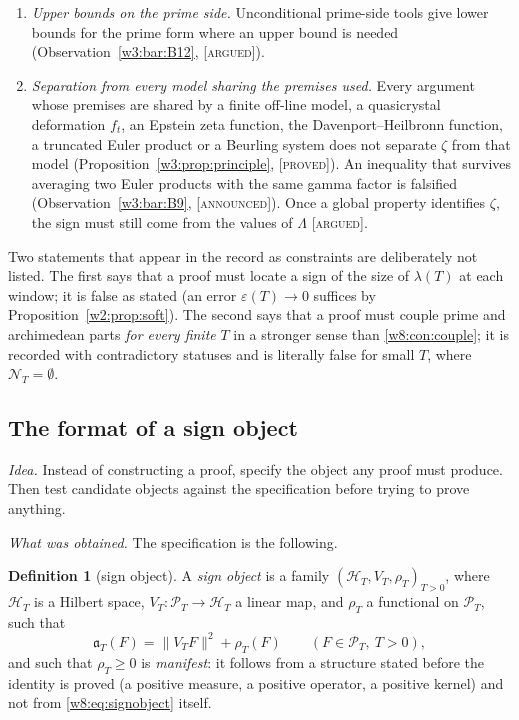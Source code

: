 \documentclass[11pt]{amsart}
\theoremstyle{definition}
\newtheorem{definition}[theorem]{Definition}
\theoremstyle{remark}
\numberwithin{equation}{section}
\newcommand{\PT}{\mathcal{P}_T}                        %
\newcommand{\NT}{\mathcal{N}_T}                        %
\newcommand{\aT}{\mathfrak{a}_T}                       %
\newcommand{\lam}{\lambda(T)}                          %
\newcommand{\stag}[1]{\textsc{[#1]}}
\newcommand{\PROVED}{\stag{proved}}
\newcommand{\ARGUED}{\stag{argued}}
\newcommand{\ANNOUNCED}{\stag{announced}}
\newcommand{\entry}[1]{\par\smallskip\noindent\textit{#1.}\enspace}
\begin{document}
\begin{enumerate}[label=\textbf{C\arabic*.},ref=C\arabic*,leftmargin=*]
envelope argument works (Observation~\ref{w3:bar:B4b}, \ANNOUNCED). The object must be defined for all windows at
once.
\item\label{w8:con:sign} \emph{Upper bounds on the prime side.} Unconditional prime-side tools give lower bounds for
the prime form where an upper bound is needed (Observation~\ref{w3:bar:B12}, \ARGUED).
\item\label{w8:con:separate} \emph{Separation from every model sharing the premises used.} Every argument whose premises
are shared by a finite off-line model, a quasicrystal deformation $f_t$, an Epstein zeta function, the
Davenport--Heilbronn function, a truncated Euler product or a Beurling system does not separate $\zeta$ from that model
(Proposition~\ref{w3:prop:principle}, \PROVED). An inequality that survives averaging two Euler products with the same
gamma factor is falsified (Observation~\ref{w3:bar:B9}, \ANNOUNCED). Once a global property identifies $\zeta$, the
sign must still come from the values of $\Lambda$ \ARGUED.
\end{enumerate}

Two statements that appear in the record as constraints are deliberately not listed. The first says
that a proof must locate a sign of the size of $\lam$ at each window; it is false as stated (an error
$\varepsilon(T)\to0$ suffices by Proposition~\ref{w2:prop:soft}). The second says that a proof must couple prime and
archimedean parts \emph{for every finite} $T$ in a stronger sense than \ref{w8:con:couple}; it is recorded with contradictory
statuses and is literally false for small $T$, where $\NT=\emptyset$.

\subsection{The format of a sign object}\label{w8:fam:R26}

\entry{Idea} Instead of constructing a proof, specify the object any proof must produce. Then test candidate objects
against the specification before trying to prove anything.

\entry{What was obtained} The specification is the following.

\begin{definition}[sign object]\label{w8:def:signobject}
A \emph{sign object} is a family $(\mathcal H_T,V_T,\rho_T)_{T>0}$, where $\mathcal H_T$ is a Hilbert space,
$V_T:\PT\to\mathcal H_T$ a linear map, and $\rho_T$ a functional on $\PT$, such that
\begin{equation}\label{w8:eq:signobject}
\aT(F)=\|V_TF\|^2+\rho_T(F)\qquad(F\in\PT,\ T>0),
\end{equation}
and such that $\rho_T\ge0$ is \emph{manifest}: it follows from a structure stated before the identity is proved (a
positive measure, a positive operator, a positive kernel) and not from \eqref{w8:eq:signobject} itself.
\end{definition}
\end{document}
